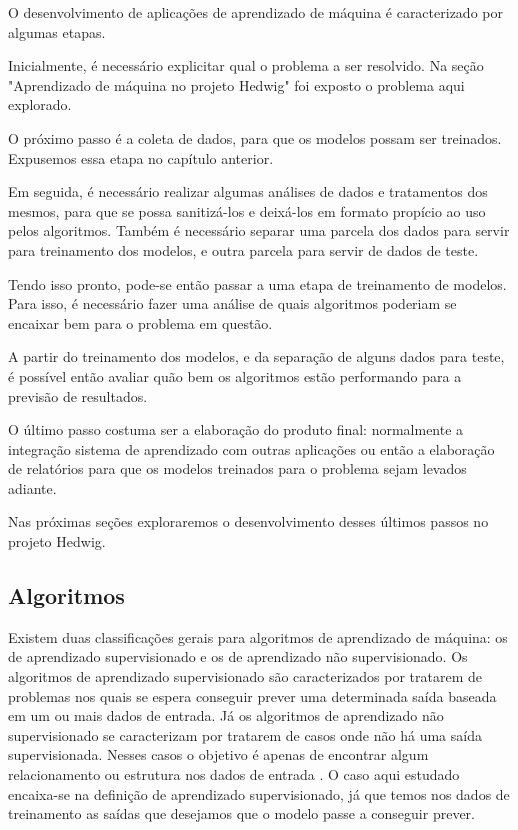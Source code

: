 			O desenvolvimento de aplicações de aprendizado de máquina é caracterizado por algumas etapas.

			Inicialmente, é necessário explicitar qual o problema a ser resolvido. Na seção "Aprendizado de máquina no projeto Hedwig" foi exposto o problema aqui explorado.

			O próximo passo é a coleta de dados, para que os modelos possam ser treinados. Expusemos essa etapa no capítulo anterior.

			Em seguida, é necessário realizar algumas análises de dados e tratamentos dos mesmos, para que se possa sanitizá-los e deixá-los em formato propício ao uso pelos algoritmos. Também é necessário separar uma parcela dos dados para servir para treinamento dos modelos, e outra parcela para servir de dados de teste.

			Tendo isso pronto, pode-se então passar a uma etapa de treinamento de modelos. Para isso, é necessário fazer uma análise de quais algoritmos poderiam se encaixar bem para o problema em questão.

			A partir do treinamento dos modelos, e da separação de alguns dados para teste, é possível então avaliar quão bem os algoritmos estão performando para a previsão de resultados.

			O último passo costuma ser a elaboração do produto final: normalmente a integração sistema de aprendizado com outras aplicações ou então a elaboração de relatórios para que os modelos treinados para o problema sejam levados adiante.

			Nas próximas seções exploraremos o desenvolvimento desses últimos passos no projeto Hedwig.

		\subsection{Algoritmos}

			Existem duas classificações gerais para algoritmos de aprendizado de máquina: os de aprendizado supervisionado e os de aprendizado não supervisionado. Os algoritmos de aprendizado supervisionado são caracterizados por tratarem de problemas nos quais se espera conseguir prever uma determinada saída baseada em um ou mais dados de entrada. Já os algoritmos de aprendizado não supervisionado se caracterizam por tratarem de casos onde não há uma saída supervisionada. Nesses casos o objetivo é apenas de encontrar algum relacionamento ou estrutura nos dados de entrada \cite{islr}. O caso aqui estudado encaixa-se na definição de aprendizado supervisionado, já que temos nos dados de treinamento as saídas que desejamos que o modelo passe a conseguir prever.

